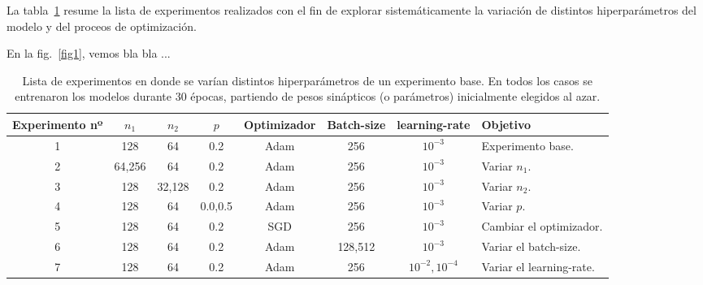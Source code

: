 \documentclass[aps,prl,preprint,groupedaddress]{revtex4-2}
\begin{document}
La tabla~\ref{tab1} resume la lista de experimentos realizados con el fin de explorar sistemáticamente la variación de distintos hiperparámetros del modelo y del proceos de optimización.

En la fig.~\ref{fig1}, vemos bla bla ...

%
\begin{table}%
\begin{ruledtabular}
\begin{tabular}{cccccccl} %
Experimento nº & $n_1$ & $n_2$ & $p$ & Optimizador & Batch-size & learning-rate & Objetivo\\ %
\hline
1 & 128 & 64 & 0.2 & Adam & 256 & $10^{-3}$ & Experimento base. \\
2 & 64,256 & 64 & 0.2 & Adam & 256 & $10^{-3}$ & Variar $n_1$. \\
3 & 128 & 32,128 & 0.2 & Adam & 256 & $10^{-3}$ & Variar $n_2$. \\
4 & 128 & 64 & 0.0,0.5 & Adam & 256 & $10^{-3}$ & Variar $p$. \\
5 & 128 & 64 & 0.2 & SGD & 256 & $10^{-3}$ & Cambiar el optimizador. \\
6 & 128 & 64 & 0.2 & Adam & 128,512 & $10^{-3}$ & Variar el batch-size. \\
7 & 128 & 64 & 0.2 & Adam & 256 & $10^{-2},10^{-4}$ & Variar el learning-rate. \\
\end{tabular}
\end{ruledtabular}
\caption{
\label{tab1}
Lista de experimentos en donde se varían distintos hiperparámetros de un experimento base.
En todos los casos se entrenaron los modelos durante 30 épocas, partiendo de pesos sinápticos (o parámetros) inicialmente elegidos al azar.
}
\end{table}
\end{document}
